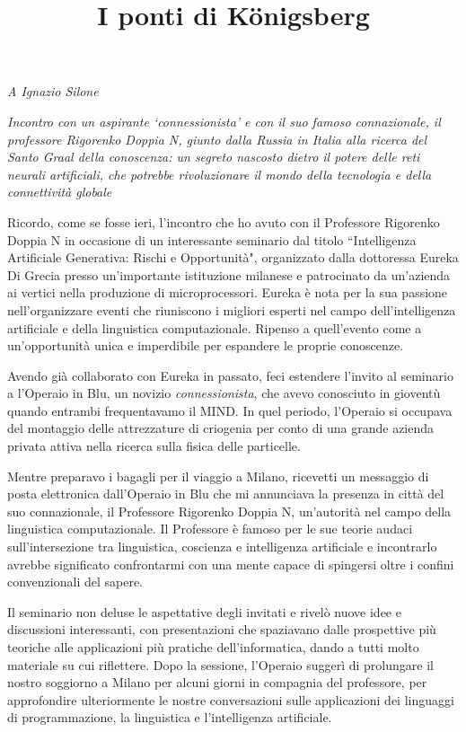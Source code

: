 \documentclass[12pt,b5paper]{article}
\date{}
\title{I ponti di Königsberg}
\begin{document}
\maketitle
\begin{flushright}
\textit{A Ignazio Silone}
\end{flushright}
\textit{Incontro con un aspirante `connessionista' e con il suo famoso connazionale,
il professore Rigorenko Doppia N, giunto dalla Russia in Italia
alla ricerca del Santo Graal della conoscenza: un segreto nascosto dietro il
potere delle reti neurali artificiali, che potrebbe rivoluzionare il mondo
della tecnologia e della connettività globale}

\vspace{10mm}

Ricordo, come se fosse ieri, l'incontro che ho avuto con il Professore Rigorenko
Doppia N in occasione di un interessante seminario dal titolo ``Intelligenza
Artificiale Generativa: Rischi e Opportunità", organizzato dalla dottoressa
Eureka Di Grecia presso un'importante istituzione milanese e patrocinato da
un'azienda ai vertici nella produzione di microprocessori. Eureka è nota per la
sua passione nell'organizzare eventi che riuniscono i migliori esperti nel campo
dell'intelligenza artificiale e della linguistica computazionale.
Ripenso a quell'evento come a un'opportunità unica e imperdibile per espandere le
proprie conoscenze.

Avendo già collaborato con Eureka in passato, feci estendere l'invito al seminario a l'Operaio in
Blu, un novizio \textit{connessionista}, che avevo conosciuto in
gioventù quando entrambi frequentavamo il MIND. In quel periodo, l'Operaio si
occupava del montaggio delle attrezzature di criogenia per conto di una grande
azienda privata attiva nella ricerca sulla fisica delle particelle.  

Mentre preparavo i bagagli per il viaggio a Milano, ricevetti un
messaggio di posta elettronica dall'Operaio in Blu che mi annunciava la
presenza in città del suo connazionale, il Professore Rigorenko Doppia N,
un'autorità nel campo della linguistica computazionale. Il Professore è famoso
per le sue teorie audaci sull'intersezione tra linguistica, coscienza e
intelligenza artificiale e incontrarlo avrebbe significato confrontarmi con una
mente capace di spingersi oltre i confini convenzionali del sapere.

Il seminario non deluse le aspettative degli invitati e rivelò nuove idee e
discussioni interessanti, con presentazioni che spaziavano dalle prospettive
più teoriche alle applicazioni più pratiche dell'informatica, dando a tutti
molto materiale su cui riflettere. Dopo la sessione, l'Operaio suggerì di
prolungare il nostro soggiorno a Milano per alcuni giorni  in compagnia
del professore, per approfondire ulteriormente le nostre conversazioni sulle
applicazioni dei linguaggi di programmazione, la linguistica e l'intelligenza
artificiale.
\end{document}
